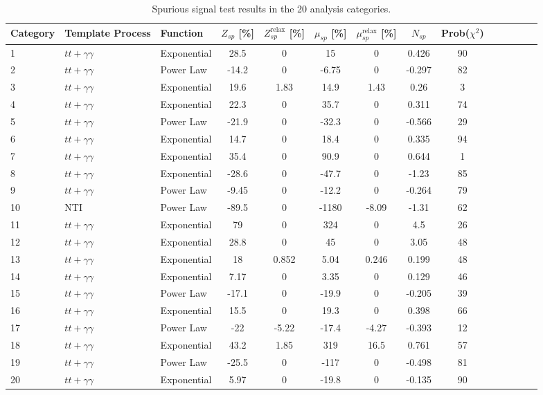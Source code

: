 \begin{table}[ht]
  \centering
  \begin{tabular}{l l l c c c c c c c c c c c}
    \hline
    Category & Template Process & Function & $Z_{sp}$ [\%] &  $Z_{sp}^\text{relax}$ [\%] & $\mu_{sp}$ [\%] & $\mu_{sp}^\text{relax}$ [\%] & $N_{sp}$ & Prob($\chi^2$)\\ \hline
1 & $tt+\gamma\gamma$ & Exponential & 28.5 & 0 & 15 & 0 & 0.426 & 90\\
2 & $tt+\gamma\gamma$ & Power Law & -14.2 & 0 & -6.75 & 0 & -0.297 & 82\\
3 & $tt+\gamma\gamma$ & Exponential & 19.6 & 1.83 & 14.9 & 1.43 & 0.26 & 3\\
4 & $tt+\gamma\gamma$ & Exponential & 22.3 & 0 & 35.7 & 0 & 0.311 & 74\\
5 & $tt+\gamma\gamma$ & Power Law & -21.9 & 0 & -32.3 & 0 & -0.566 & 29\\
6 & $tt+\gamma\gamma$ & Exponential & 14.7 & 0 & 18.4 & 0 & 0.335 & 94\\
7 & $tt+\gamma\gamma$ & Exponential & 35.4 & 0 & 90.9 & 0 & 0.644 & 1\\
8 & $tt+\gamma\gamma$ & Exponential & -28.6 & 0 & -47.7 & 0 & -1.23 & 85\\
9 & $tt+\gamma\gamma$ & Power Law & -9.45 & 0 & -12.2 & 0 & -0.264 & 79\\
10 & NTI & Power Law & -89.5 & 0 & -1180 & -8.09 & -1.31 & 62\\
11 & $tt+\gamma\gamma$ & Exponential & 79 & 0 & 324 & 0 & 4.5 & 26\\
12 & $tt+\gamma\gamma$ & Exponential & 28.8 & 0 & 45 & 0 & 3.05 & 48\\ \hline
13 & $tt+\gamma\gamma$ & Exponential & 18 & 0.852 & 5.04 & 0.246 & 0.199 & 48\\
14 & $tt+\gamma\gamma$ & Exponential & 7.17 & 0 & 3.35 & 0 & 0.129 & 46\\
15 & $tt+\gamma\gamma$ & Power Law & -17.1 & 0 & -19.9 & 0 & -0.205 & 39\\
16 & $tt+\gamma\gamma$ & Exponential & 15.5 & 0 & 19.3 & 0 & 0.398 & 66\\
17 & $tt+\gamma\gamma$ & Power Law & -22 & -5.22 & -17.4 & -4.27 & -0.393 & 12\\
18 & $tt+\gamma\gamma$ & Exponential & 43.2 & 1.85 & 319 & 16.5 & 0.761 & 57\\
19 & $tt+\gamma\gamma$ & Power Law & -25.5 & 0 & -117 & 0 & -0.498 & 81\\
20 & $tt+\gamma\gamma$ & Exponential & 5.97 & 0 & -19.8 & 0 & -0.135 & 90\\ \hline
    \hline
  \end{tabular}
  \caption{Spurious signal test results in the 20 analysis categories.}
  \label{tab:spuriousSignal_1}
\end{table}

